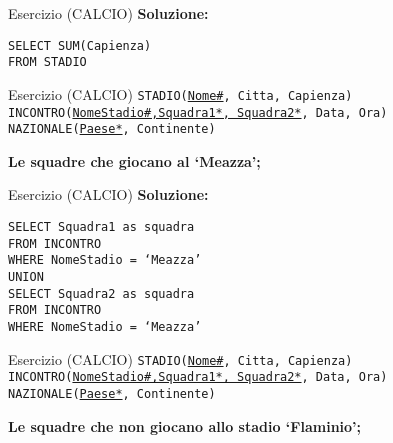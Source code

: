 \begin{frame}{Esercizio (CALCIO)}
    \textbf{Soluzione:}
    \vspace{1em}
    
    \texttt{SELECT SUM(Capienza)\\FROM STADIO}
\end{frame}
\begin{frame}{Esercizio (CALCIO) } 
    \texttt{STADIO(\underline{Nome\#}, Citta, Capienza)\\
    INCONTRO(\underline{NomeStadio\#,Squadra1*, Squadra2*}, Data, Ora)\\
    NAZIONALE(\underline{Paese*}, Continente)}
    \vspace{1em}
    
    \textbf{Le squadre che giocano al `Meazza';}
\end{frame}

\begin{frame}{Esercizio (CALCIO)}
    \textbf{Soluzione:}
    \vspace{1em}
    
    \texttt{SELECT Squadra1 as squadra\\FROM INCONTRO\\WHERE NomeStadio = `Meazza'
\\UNION\\SELECT Squadra2 as squadra\\FROM INCONTRO\\WHERE NomeStadio = `Meazza'}
\end{frame}
\begin{frame}{Esercizio (CALCIO) } 
    \texttt{STADIO(\underline{Nome\#}, Citta, Capienza)\\
    INCONTRO(\underline{NomeStadio\#,Squadra1*, Squadra2*}, Data, Ora)\\
    NAZIONALE(\underline{Paese*}, Continente)}
    \vspace{1em}
    
    \textbf{Le squadre che non giocano allo stadio `Flaminio';}
\end{frame}

